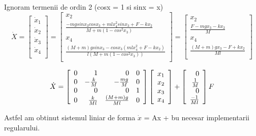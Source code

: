 \documentclass[12pt]{article}
\begin{document}
Ignoram termenii de ordin 2 (cosx = 1 si sinx = x)
\[\dot  X = 
 \left[\begin{array}{r}
  \dot x_1\\
    \dot x_2\\
   \dot x_3\\ 
	\dot x_4\\
   \end{array} \right]
 =\left[\begin{array}{r}
 x_2{~~~~~~~~~~~~~~~~~~~}\\
 \frac{-mgsin x_3 cos x_3 + mlx_4^2 sin x_3 + F - k x_2}{M+m(1-cos^2x_3)}\\
 x_4{~~~~~~~~~~~~~~~~~~~}\\
 \frac{(M+m)gsinx_3 - cosx_3(mlx_4^2 + F - k x_2)}{l(M+m(1-cos^2 x_3))}\\
\end{array}\right]
=\left[\begin{array}{r}
 x_2{~~~~~~~~~}\\
 \frac{F -mgx_3 -kx_2}{M}{~~~}\\
 x_4{~~~~~~~~~}\\
 \frac{(M+m)gx_3-F+kx_2}{Ml} \\
\end{array}\right]
\]\newline

\[\dot  X = 
\left[\begin{array}{r r r r}
0 & 1 & 0 & 0 \\
0 & -\frac{k}{M} & -\frac{mg}{M} & 0\\
0 & 0 & 0 & 1\\
0 & \frac{k}{Ml} & \frac{(M+m)g}{Ml} & 0\\
\end{array} \right]
 \left[\begin{array}{r}
   x_1\\
     x_2\\
    x_3\\ 
	 x_4\\
   \end{array} \right]
+ \left[\begin{array}{r}
0\\
\frac{1}{M}\\
0\\
\frac{-1}{Ml}
\end{array}\right] F
\]\newline

Astfel am obtinut sistemul liniar de forma $\dot x$ = Ax + bu necesar implementarii regularului.\newline\newline
\end{document}
